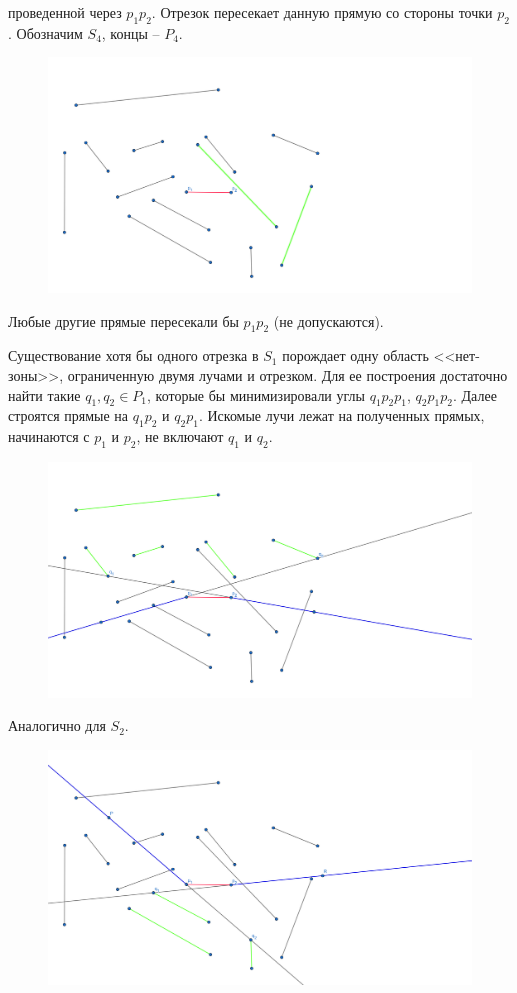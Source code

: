 \documentclass[letterpaper,12pt]{article}
\begin{document}
\begin{enumerate}
            проведенной через $p_1 p_2$. Отрезок пересекает
            данную прямую со стороны точки $p_2$.
            Обозначим $S_4$, концы -- $P_4$.
            \begin{figure}[H]
                  \centering
                  \includegraphics[width=0.5\linewidth]{segment_4.png}
            \end{figure}
            Любые другие прямые пересекали бы $p_1 p_2$ 
            (не допускаются).
\end{enumerate}
\par
Существование хотя бы одного отрезка в $S_1$ порождает
одну область <<нет-зоны>>, ограниченную двумя лучами и отрезком.
Для ее построения достаточно найти такие  $q_1, q_2 \in P_1$,
которые бы минимизировали углы $q_1 p_2 p_1$, $q_2 p_1 p_2$.
Далее строятся прямые на $q_1 p_2$ и $q_2 p_1$. Искомые лучи
лежат на полученных прямых, начинаются с $p_1$ и $p_2$, 
не включают $q_1$ и $q_2$.
\begin{figure}[H]
      \centering
      \includegraphics[width=0.5\linewidth]{rays_1.png}
\end{figure}
\par
Аналогично для $S_2$.
\begin{figure}[H]
      \centering
      \includegraphics[width=0.5\linewidth]{rays_2.png}
\end{figure}
\par
\end{document}
